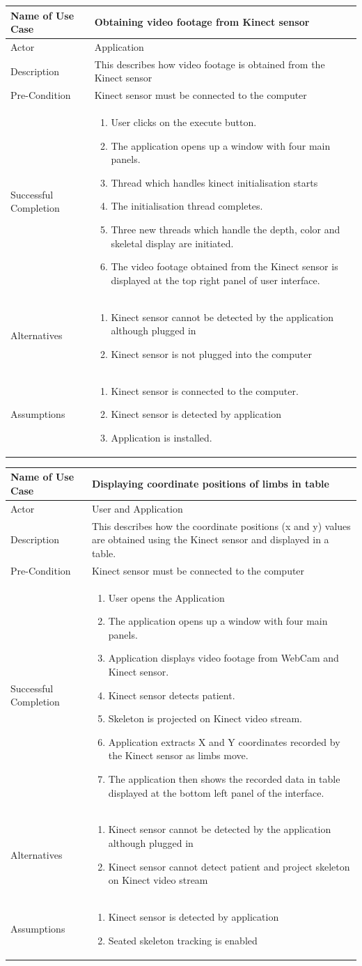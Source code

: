 \documentclass[a4paper, 12pt]{article}
\newcommand\addrow[2]{#1 &#2\\ }
\newcommand\addheading[2]{#1 &#2\\ \hline}
\newcommand\tabularhead{\begin{tabular}{lp{8cm}}
\hline
}
\newcommand\addmulrow[2]{ \begin{minipage}[t][][t]{2.5cm}#1\end{minipage}%
   &\begin{minipage}[t][][t]{8cm}
    \begin{enumerate} #2   \end{enumerate}
    \end{minipage}\\ }
\newenvironment{usecase}{\tabularhead}
{\hline\end{tabular}}
\begin{document}
\begin{usecase}
	\addheading{Name of Use Case}{Obtaining video footage from Kinect sensor}
	\addrow{Actor}{Application}
	\addrow{Description}{This describes how video footage is obtained from the Kinect sensor}
	\addrow{Pre-Condition}{Kinect sensor must be connected to the computer}
	\addmulrow{Successful Completion}{
		\item User clicks on the execute button. 
		\item The application opens up a window with four main panels. 
		\item Thread which handles kinect initialisation starts
		\item The initialisation thread completes. 
		\item Three new threads which handle the depth, color and skeletal display are initiated.
		\item The video footage obtained from the Kinect sensor is displayed at the top right panel of user interface.}
	\addmulrow{Alternatives}{
	\item Kinect sensor cannot be detected by the application although plugged in
	\item Kinect sensor is not plugged into the computer}
	\addmulrow{Assumptions}{
	\item Kinect sensor is connected to the computer.
	\item Kinect sensor is detected by application 
	\item Application is installed.}
\end{usecase}

\begin{usecase}
	\addheading{Name of Use Case}{Displaying coordinate positions of limbs in table}
	\addrow{Actor}{User and Application}
	\addrow{Description}{This describes how the coordinate positions (x and y) values are obtained using the Kinect sensor and displayed in a table.}
	\addrow{Pre-Condition}{Kinect sensor must be connected to the computer}
	\addmulrow{Successful Completion}{
		\item User opens the Application
		\item The application opens up a window with four main panels. 
		\item Application displays video footage from WebCam and Kinect sensor.
		\item Kinect sensor detects patient.  
		\item Skeleton is projected on Kinect video stream.
		\item Application extracts X and Y coordinates recorded by the Kinect sensor as limbs move.  
		\item The application then shows the recorded data in table displayed at the bottom left panel of the interface.}
	\addmulrow{Alternatives}{
	\item Kinect sensor cannot be detected by the application although plugged in
	\item Kinect sensor cannot detect patient and project skeleton on Kinect video stream}
	\addmulrow{Assumptions}{
	\item Kinect sensor is detected by application 
	\item Seated skeleton tracking is enabled}
\end{usecase}
\end{document}
